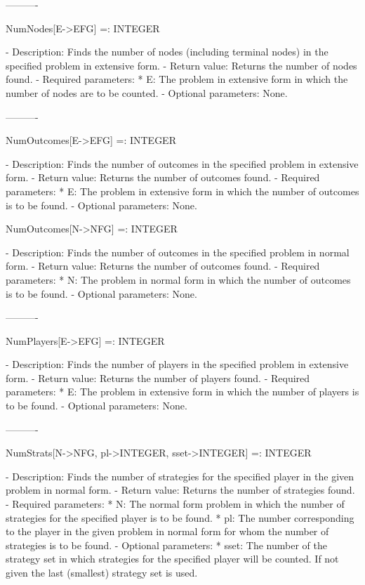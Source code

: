 ----------

NumNodes[E->EFG] =: INTEGER

   -	Description:  Finds the number of nodes (including terminal nodes) in 
	the specified problem in extensive form.
   -	Return value:  Returns the number of nodes found.
   -	Required parameters:
	  *  E:  The problem in extensive form in which the number of nodes are
		to be counted.
   -	Optional parameters:  None.

----------

NumOutcomes[E->EFG] =: INTEGER

   -	Description:  Finds the number of outcomes in the specified problem in
	extensive form.
   -	Return value:  Returns the number of outcomes found.
   -	Required parameters:
	  *  E:  The problem in extensive form in which the number of outcomes
		is to be found.
   -	Optional parameters:  None.


NumOutcomes[N->NFG] =: INTEGER

   -	Description:  Finds the number of outcomes in the specified problem in
	normal form.
   -	Return value:  Returns the number of outcomes found.
   -	Required parameters:
	  *  N:  The problem in normal form in which the number of outcomes is
		to be found.
   -	Optional parameters:  None.

----------

NumPlayers[E->EFG] =: INTEGER

   -	Description:  Finds the number of players in the specified problem in
	extensive form.
   -	Return value:  Returns the number of players found.
   -	Required parameters:
	  *  E:  The problem in extensive form in which the number of players
		is to be found.
   -	Optional parameters:  None.

----------

NumStrats[N->NFG, pl->INTEGER, {sset->INTEGER}] =: INTEGER

   -	Description:  Finds the number of strategies for the specified player 
	in the given problem in normal form.
   -	Return value:  Returns the number of strategies found.
   -	Required parameters:
	  *  N:  The normal form problem in which the number of strategies for
		the specified player is to be found.
	  *  pl:  The number corresponding to the player in the given problem 
		in normal form for whom the number of strategies is to be
		found.
   -	Optional parameters:
	  *  sset:  The number of the strategy set in which strategies for the
		specified player will be counted.  If not given the last
		(smallest) strategy set is used.

